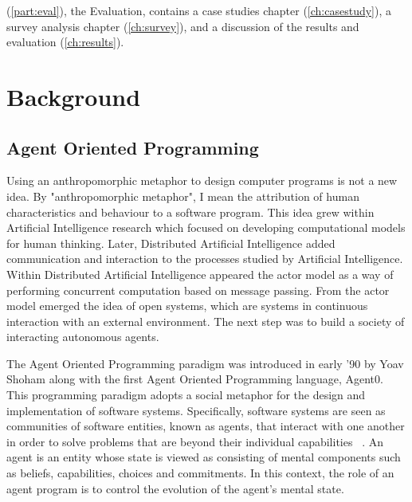\documentclass[a4paper,12pt,oneside,fleqn]{book} %
\newcommand{\rg}[1]{\marginpar{\tiny\raggedright\textcolor{blue}{\bf rg:} #1}}
\newcommand{\todo}[1]{[\textcolor{red}{TODO}: #1]}
\renewcommand{\rg}{}
\begin{document}
(\autoref{part:eval}), the Evaluation, contains a case studies chapter
(\autoref{ch:casestudy}), a survey analysis chapter
(\autoref{ch:survey}), and a discussion of the results and evaluation
(\autoref{ch:results}).




\part{Background}\label{ch:aop} %
\chapter{Agent Oriented Programming} %

Using an anthropomorphic metaphor to design computer programs is not a new
idea. By "anthropomorphic metaphor", I mean the attribution of human
characteristics and behaviour to a software program. This idea grew within
Artificial Intelligence research which focused on developing computational
models for human thinking. Later, Distributed Artificial Intelligence added
communication and interaction to the processes studied by Artificial
Intelligence.  Within Distributed Artificial Intelligence appeared the
actor model as a way of performing concurrent computation based on message
passing. From the actor model emerged the idea of open systems, which are
systems in continuous interaction with an external environment. The next step
was to build a society of interacting autonomous agents.

The Agent Oriented Programming paradigm was introduced in early '90 by Yoav
Shoham along with the first Agent Oriented Programming language, Agent0.
This programming paradigm adopts a social metaphor for the design and
implementation of software systems. Specifically, software systems are seen
as communities of software entities, known as agents, that interact with
one another in order to solve problems that are beyond their individual
capabilities ~\cite{DBLP:journals/ai/Shoham93}. An agent is an entity whose
state is viewed as consisting of mental components such as beliefs,
capabilities, choices and commitments. In this context, the role of an
agent program is to control the evolution of the agent's mental state.
\end{document}

